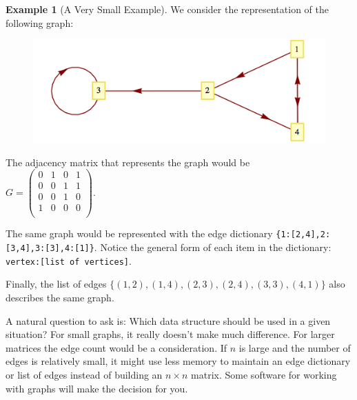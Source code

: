 \documentclass[10pt,]{book}
\theoremstyle{plain}
\theoremstyle{definition}
\theoremstyle{definition}
\theoremstyle{definition}
\newtheorem{example}[theorem]{Example}
\theoremstyle{definition}
\theoremstyle{definition}
\numberwithin{equation}{section}
\begin{document}
\begin{example}[A Very Small Example]\label{ex-data-structure-sample}
We consider the representation of the following graph:%
\leavevmode%
\begin{figure}
\centering
\includegraphics[width=1\linewidth]{images/fig-example-9-2-1.png}
\end{figure}
\par
The adjacency matrix that represents the graph would be 
\(\quad \quad\)\(G=\left(
\begin{array}{cccc}
 0 & 1 & 0 & 1 \\
 0 & 0 & 1 & 1 \\
 0 & 0 & 1 & 0 \\
 1 & 0 & 0 & 0 \\
\end{array}
\right)\).%
\par
The same graph would be represented with the edge dictionary 
\lstinline?{1:[2,4],2:[3,4],3:[3],4:[1]}?.  Notice the general form of each item in the dictionary: \lstinline?vertex:[list of vertices]?.%
\par
Finally, the list of edges \(\{(1,2),(1,4),(2,3),(2,4),(3,3),(4,1)\}\) also describes the same graph.%
\end{example}
A natural question to ask is: Which data structure should be used in a given situation? For small graphs, it really doesn't make much difference.  For larger matrices the edge count would be a consideration. If \(n\) is large and the
number of edges is relatively small, it might use less memory to maintain an edge dictionary or  list of edges instead of building an \(n \times  n\) matrix. Some software for working with graphs will make the decision for you.%
\end{document}
